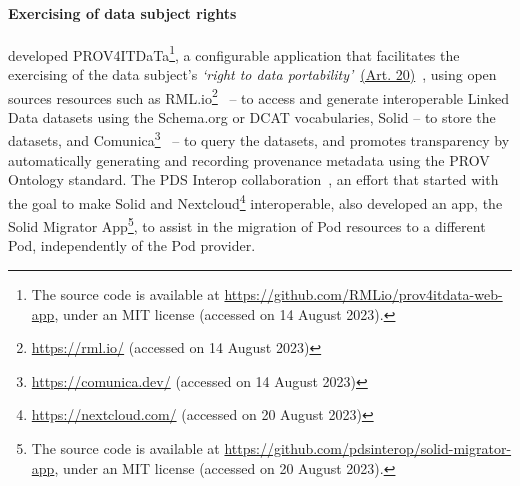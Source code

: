 \paragraph{Exercising of data subject rights} 
\cite{de_mulder_prov4itdata_2021} developed PROV4ITDaTa\footnote{The source code is available at \url{https://github.com/RMLio/prov4itdata-web-app}, under an MIT license (accessed on 14 August 2023).}, a configurable application that facilitates the exercising of the data subject's \textit{`right to data portability'}~\hyperref[art:20]{(Art. 20)}~\citeyearpar{noauthor_regulation_2016}, using open sources resources such as RML.io\footnote{\url{https://rml.io/} (accessed on 14 August 2023)}~\citep{dimou_rml_2014} -- to access and generate interoperable Linked Data datasets using the Schema.org or DCAT vocabularies, Solid -- to store the datasets, and Comunica\footnote{\url{https://comunica.dev/} (accessed on 14 August 2023)}~\citep{taelman_comunica_2018} -- to query the datasets, and promotes transparency by automatically generating and recording provenance metadata using the PROV Ontology standard.
The PDS Interop collaboration~\citeyearpar{noauthor_pds_2021}, an effort that started with the goal to make Solid and Nextcloud\footnote{\url{https://nextcloud.com/} (accessed on 20 August 2023)} interoperable, also developed an app, the Solid Migrator App\footnote{The source code is available at \url{https://github.com/pdsinterop/solid-migrator-app}, under an MIT license (accessed on 20 August 2023).}, to assist in the migration of Pod resources to a different Pod, independently of the Pod provider.


